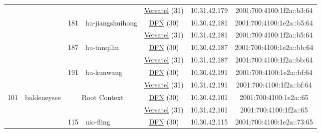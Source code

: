\begin{small}
\begin{center}
\begin{longtable}{|c|c|c|c|c|c|c|c|}
  &  &  &  & \multicolumn{2}{|c|}{\tiny{\href{http://www.versatel.de}{Versatel} (31)}} & \tiny{10.31.42.179} & \tiny{2001:700:4100:1f2a::b3:64} \\* \cline{3-3}\cline{4-4}\cline{5-5}\cline{6-6}\cline{7-7}\cline{8-8}
  &  & \multirow{2}{*}{\tiny{181}} & \multicolumn{1}{|l|}{\multirow{2}{*}{\tiny{hu-jiangshuihong}}} & \multicolumn{2}{|c|}{\tiny{\href{https://www.dfn.de}{DFN} (30)}} & \tiny{10.30.42.181} & \tiny{2001:700:4100:1e2a::b5:64} \\* \cline{5-5}\cline{6-6}\cline{7-7}\cline{8-8}
  &  &  &  & \multicolumn{2}{|c|}{\tiny{\href{http://www.versatel.de}{Versatel} (31)}} & \tiny{10.31.42.181} & \tiny{2001:700:4100:1f2a::b5:64} \\* \cline{3-3}\cline{4-4}\cline{5-5}\cline{6-6}\cline{7-7}\cline{8-8}
  &  & \multirow{2}{*}{\tiny{187}} & \multicolumn{1}{|l|}{\multirow{2}{*}{\tiny{hu-tanqilin}}} & \multicolumn{2}{|c|}{\tiny{\href{https://www.dfn.de}{DFN} (30)}} & \tiny{10.30.42.187} & \tiny{2001:700:4100:1e2a::bb:64} \\* \cline{5-5}\cline{6-6}\cline{7-7}\cline{8-8}
  &  &  &  & \multicolumn{2}{|c|}{\tiny{\href{http://www.versatel.de}{Versatel} (31)}} & \tiny{10.31.42.187} & \tiny{2001:700:4100:1f2a::bb:64} \\* \cline{3-3}\cline{4-4}\cline{5-5}\cline{6-6}\cline{7-7}\cline{8-8}
  &  & \multirow{2}{*}{\tiny{191}} & \multicolumn{1}{|l|}{\multirow{2}{*}{\tiny{hu-kunwang}}} & \multicolumn{2}{|c|}{\tiny{\href{https://www.dfn.de}{DFN} (30)}} & \tiny{10.30.42.191} & \tiny{2001:700:4100:1e2a::bf:64} \\* \cline{5-5}\cline{6-6}\cline{7-7}\cline{8-8}
  &  &  &  & \multicolumn{2}{|c|}{\tiny{\href{http://www.versatel.de}{Versatel} (31)}} & \tiny{10.31.42.191} & \tiny{2001:700:4100:1f2a::bf:64} \\ \hline
 \multirow{42}{*}{\tiny{101}} & \multicolumn{1}{|l|}{\multirow{42}{*}{\tiny{baldeneysee}}} & \multicolumn{2}{|c|}{\multirow{2}{*}{\tiny{Root Context}}} & \multicolumn{2}{|c|}{\tiny{\href{https://www.dfn.de}{DFN} (30)}} & \tiny{10.30.42.101} & \tiny{2001:700:4100:1e2a::65} \\* \cline{5-5}\cline{6-6}\cline{7-7}\cline{8-8}
  &  & \multicolumn{2}{|c|}{} & \multicolumn{2}{|c|}{\tiny{\href{http://www.versatel.de}{Versatel} (31)}} & \tiny{10.31.42.101} & \tiny{2001:700:4100:1f2a::65} \\* \cline{3-3}\cline{4-4}\cline{5-5}\cline{6-6}\cline{7-7}\cline{8-8}
  &  & \multirow{2}{*}{\tiny{115}} & \multicolumn{1}{|l|}{\multirow{2}{*}{\tiny{uio-fling}}} & \multicolumn{2}{|c|}{\tiny{\href{https://www.dfn.de}{DFN} (30)}} & \tiny{10.30.42.115} & \tiny{2001:700:4100:1e2a::73:65} \\* \cline{5-5}\cline{6-6}\cline{7-7}\cline{8-8}

\end{longtable}
\end{center}
\end{small}
